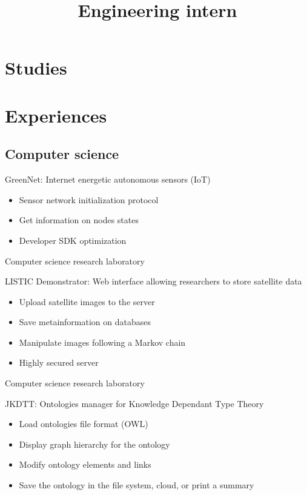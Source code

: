 \documentclass[10pt,a4paper,sans]{moderncv}        %
\title{Engineering intern}                               %
\begin{document}
\makecvtitle

\section{Studies}

\section{Experiences}
\subsection{Computer science}
	{GreenNet: Internet energetic autonomous sensors (IoT)
	\begin{itemize}
		\item Sensor network initialization protocol
		\item Get information on nodes states
		\item Developer SDK optimization
	\end{itemize}
	}
	{Computer science research laboratory}
	{LISTIC Demonstrator: Web interface allowing researchers to store satellite
		data
	\begin{itemize}
		\item Upload satellite images to the server
		\item Save metainformation on databases
		\item Manipulate images following a Markov chain
		\item Highly secured server
	\end{itemize}
	}
	{Computer science research laboratory}
	{JKDTT: Ontologies manager for Knowledge Dependant Type Theory
	\begin{itemize}
		\item Load ontologies file format (OWL)
		\item Display graph hierarchy for the ontology
		\item Modify ontology elements and links
		\item Save the ontology in the file system, cloud, or print a summary
	\end{itemize}
	}
\end{document}

